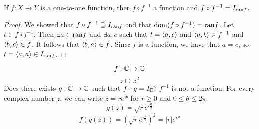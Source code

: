 \begin{prop}
If $f: X \to Y$ is a one-to-one function, then $f \circ f^{-1}$ a function and $f \circ f^{-1} = I_{\text{ran} f}$.
\end{prop}
\begin{proof}
We showed that $f \circ f^{-1} \supseteq I_{\text{ran} f}$ and that $\text{dom}(f \circ f^{-1}) = \text{ran} f$. Let $t \in f \circ f^{-1}$.
Then $\exists a \in \text{ran} f$ and $\exists a, c$ such that $t = \langle a, c\rangle$ and $\langle a, b\rangle \in f^{-1}$ and $\langle b, c\rangle \in f$.
It follows that $\langle b, a\rangle \in f$. Since $f$ is a function, we have that $a = c$, so $t = \langle a, a\rangle \in I_{\text{ran} f}$.
\end{proof}
\begin{ex}
\[f: \mathbb{C} \to \mathbb{C}\]
\[z \mapsto z^2\]
Does there exists $g: \mathbb{C} \to \mathbb{C}$ such that $f \circ g = I_{\mathbb{C}}$? $f^{-1}$ is not a function.
For every complex number $z$, we can write $z = re^{i\theta}$ for $r \geq 0$ and $0 \leq \theta \leq 2\pi$. 
\[g(z) = \sqrt{r}e^{i\frac{\theta}{2}}\]
\[f(g(z)) = (\sqrt{r}e^{i\frac{\theta}{2}})^2 = |r|e^{i\theta}\]
\end{ex}
